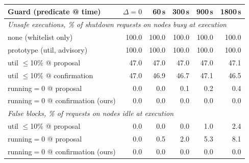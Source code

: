 \begin{tabular}{lrrrrr}
\toprule
Guard (predicate @ time) & $\Delta{=}0$ & 60\,s & 300\,s & 900\,s & 1800\,s \\
\midrule
\multicolumn{6}{l}{\emph{Unsafe executions, \% of shutdown requests on nodes busy at execution}} \\
none (whitelist only) & 100.0 & 100.0 & 100.0 & 100.0 & 100.0 \\
prototype (util, advisory) & 100.0 & 100.0 & 100.0 & 100.0 & 100.0 \\
util $\le$10\% @ proposal & 47.0 & 47.0 & 47.0 & 47.0 & 47.1 \\
util $\le$10\% @ confirmation & 47.0 & 46.9 & 46.7 & 47.1 & 46.5 \\
running$=$0 @ proposal & 0.0 & 0.0 & 0.1 & 0.2 & 0.4 \\
running$=$0 @ confirmation (ours) & 0.0 & 0.0 & 0.0 & 0.0 & 0.0 \\
\midrule
\multicolumn{6}{l}{\emph{False blocks, \% of requests on nodes idle at execution}} \\
util $\le$10\% @ proposal & 0.0 & 0.0 & 0.0 & 1.0 & 2.4 \\
running$=$0 @ proposal & 0.0 & 0.5 & 2.0 & 5.3 & 8.1 \\
running$=$0 @ confirmation (ours) & 0.0 & 0.0 & 0.0 & 0.0 & 0.0 \\
\bottomrule
\end{tabular}
